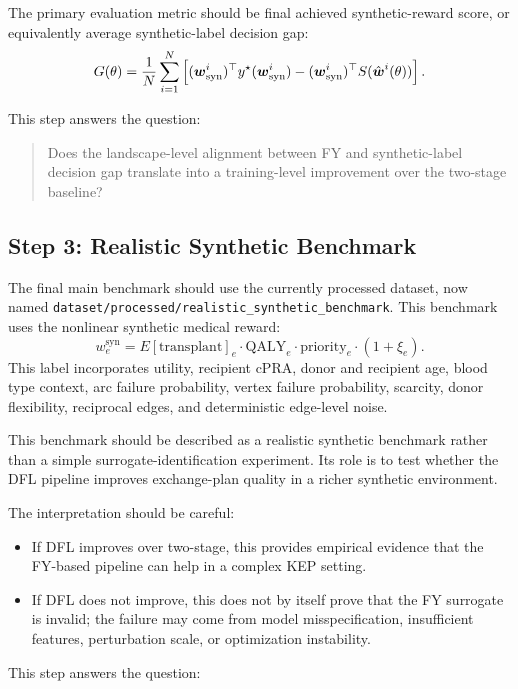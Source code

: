 \documentclass{article}
\begin{document}
The primary evaluation metric should be final achieved synthetic-reward score,
or equivalently average synthetic-label decision gap:
\[
    G(\theta)
    =
    \frac{1}{N}
    \sum_{i=1}^{N}
    \left[
        (\boldsymbol{w}_{\mathrm{syn}}^i)^\top y^\star(\boldsymbol{w}_{\mathrm{syn}}^i)
        -
        (\boldsymbol{w}_{\mathrm{syn}}^i)^\top S(\hat {\boldsymbol{w}}^i(\theta))
    \right].
\]

This step answers the question:

\begin{quote}
Does the landscape-level alignment between FY and synthetic-label decision gap
translate into a training-level improvement over the two-stage baseline?
\end{quote}

\subsection{Step 3: Realistic Synthetic Benchmark}

The final main benchmark should use the currently processed dataset, now named
\texttt{dataset/processed/realistic\_synthetic\_benchmark}. This benchmark uses
the nonlinear synthetic medical reward:
\[
    w^{\mathrm{syn}}_e
    =
    E[\mathrm{transplant}]_e
    \cdot
    \mathrm{QALY}_e
    \cdot
    \mathrm{priority}_e
    \cdot
    (1+\xi_e).
\]
This label incorporates utility, recipient cPRA, donor and recipient age, blood
type context, arc failure probability, vertex failure probability, scarcity,
donor flexibility, reciprocal edges, and deterministic edge-level noise.

This benchmark should be described as a realistic synthetic benchmark rather
than a simple surrogate-identification experiment. Its role is to test whether
the DFL pipeline improves exchange-plan quality in a richer synthetic
environment.

The interpretation should be careful:
\begin{itemize}
    \item If DFL improves over two-stage, this provides empirical evidence that
    the FY-based pipeline can help in a complex KEP setting.
    \item If DFL does not improve, this does not by itself prove that the FY
    surrogate is invalid; the failure may come from model misspecification,
    insufficient features, perturbation scale, or optimization instability.
\end{itemize}

This step answers the question:
\end{document}
